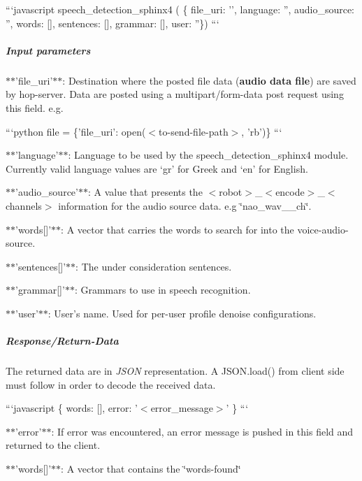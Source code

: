 ```javascript speech\-\_\-detection\-\_\-sphinx4 ( \{ file\-\_\-uri\-: '', language\-: '', audio\-\_\-source\-: '', words\-: \mbox{[}\mbox{]}, sentences\-: \mbox{[}\mbox{]}, grammar\-: \mbox{[}\mbox{]}, user\-: ''\}) ```

\subparagraph*{Input parameters}


\begin{DoxyItemize}
\item $\ast$$\ast$'file\-\_\-uri'$\ast$$\ast$\-: Destination where the posted file data ({\bfseries audio data file}) are saved by hop-\/server. Data are posted using a multipart/form-\/data post request using this field. e.\-g.
\end{DoxyItemize}

```python file = \{'file\-\_\-uri'\-: open($<$to-\/send-\/file-\/path$>$, 'rb')\} ```


\begin{DoxyItemize}
\item $\ast$$\ast$'language'$\ast$$\ast$\-: Language to be used by the speech\-\_\-detection\-\_\-sphinx4 module. Currently valid language values are ‘gr’ for Greek and ‘en’ for English.
\item $\ast$$\ast$'audio\-\_\-source'$\ast$$\ast$\-: A value that presents the $<$robot$>$\-\_\-$<$encode$>$\-\_\-$<$channels$>$ information for the audio source data. e.\-g \char`\"{}nao\-\_\-wav\-\_\-\_\-ch\char`\"{}.
\item $\ast$$\ast$'words\mbox{[}\mbox{]}'$\ast$$\ast$\-: A vector that carries the words to search for into the voice-\/audio-\/source.
\item $\ast$$\ast$'sentences\mbox{[}\mbox{]}'$\ast$$\ast$\-: The under consideration sentences.
\item $\ast$$\ast$'grammar\mbox{[}\mbox{]}'$\ast$$\ast$\-: Grammars to use in speech recognition.
\item $\ast$$\ast$'user'$\ast$$\ast$\-: User’s name. Used for per-\/user profile denoise configurations.
\end{DoxyItemize}

\subparagraph*{Response/\-Return-\/\-Data}

The returned data are in {\itshape J\-S\-O\-N} representation. A J\-S\-O\-N.\-load() from client side must follow in order to decode the received data.

```javascript \{ words\-: \mbox{[}\mbox{]}, error\-: '$<$error\-\_\-message$>$' \} ```


\begin{DoxyItemize}
\item $\ast$$\ast$'error'$\ast$$\ast$\-: If error was encountered, an error message is pushed in this field and returned to the client.
\item $\ast$$\ast$'words\mbox{[}\mbox{]}'$\ast$$\ast$\-: A vector that contains the \char`\"{}words-\/found\char`\"{}
\end{DoxyItemize}

